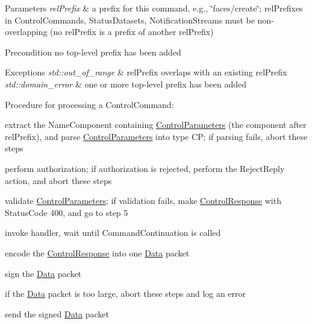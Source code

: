 \begin{DoxyParams}{Parameters}
{\em rel\+Prefix} & a prefix for this command, e.\+g., \char`\"{}faces/create\char`\"{}; rel\+Prefixes in Control\+Commands, Status\+Datasets, Notification\+Streams must be non-\/overlapping (no rel\+Prefix is a prefix of another rel\+Prefix) \\
\hline
\end{DoxyParams}
\begin{DoxyPrecond}{Precondition}
no top-\/level prefix has been added 
\end{DoxyPrecond}

\begin{DoxyExceptions}{Exceptions}
{\em std\+::out\+\_\+of\+\_\+range} & {\ttfamily rel\+Prefix} overlaps with an existing rel\+Prefix \\
\hline
{\em std\+::domain\+\_\+error} & one or more top-\/level prefix has been added\\
\hline
\end{DoxyExceptions}
Procedure for processing a Control\+Command\+:
\begin{DoxyEnumerate}
\item extract the Name\+Component containing \hyperlink{classndn_1_1mgmt_1_1ControlParameters}{Control\+Parameters} (the component after rel\+Prefix), and parse \hyperlink{classndn_1_1mgmt_1_1ControlParameters}{Control\+Parameters} into type CP; if parsing fails, abort these steps
\item perform authorization; if authorization is rejected, perform the Reject\+Reply action, and abort these steps
\item validate \hyperlink{classndn_1_1mgmt_1_1ControlParameters}{Control\+Parameters}; if validation fails, make \hyperlink{classndn_1_1mgmt_1_1ControlResponse}{Control\+Response} with Status\+Code 400, and go to step 5
\item invoke handler, wait until Command\+Continuation is called
\item encode the \hyperlink{classndn_1_1mgmt_1_1ControlResponse}{Control\+Response} into one \hyperlink{classndn_1_1Data}{Data} packet
\item sign the \hyperlink{classndn_1_1Data}{Data} packet
\item if the \hyperlink{classndn_1_1Data}{Data} packet is too large, abort these steps and log an error
\item send the signed \hyperlink{classndn_1_1Data}{Data} packet 
\end{DoxyEnumerate}

